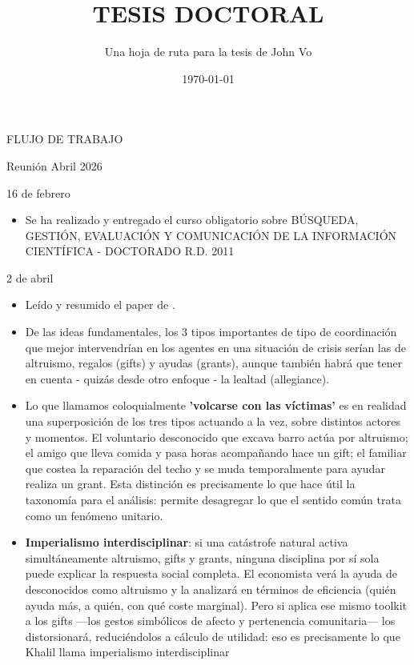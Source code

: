 \documentclass[a4paper,11pt]{article}
\title{TESIS DOCTORAL}
\author{Una hoja de ruta para la tesis de John Vo}
\date{\today}
\begin{document}
\maketitle

\newpage

\vspace*{\fill}
\begin{center}
    {\fontsize{1.5cm}{16pt}\selectfont FLUJO DE TRABAJO}
\end{center}
\vspace*{\fill}
\newpage

    \begin{seccionbox}[violetasuave]{Reunión Abril 2026}
        \begin{updateo}{16 de febrero}
            \begin{itemize}
                \item Se ha realizado y entregado el curso obligatorio sobre BÚSQUEDA, GESTIÓN, EVALUACIÓN Y COMUNICACIÓN DE LA INFORMACIÓN CIENTÍFICA - DOCTORADO R.D. 2011
            \end{itemize}
        \end{updateo} 
        \begin{updateo}{2 de abril}
            \begin{itemize}
                \item Leído y resumido el paper de \textcite{khalil_2025a}. 
                \item De las ideas fundamentales, los 3 tipos importantes de tipo de coordinación que mejor intervendrían en los agentes en una situación de crisis serían las de altruismo, regalos (gifts) y ayudas (grants), aunque también habrá que tener en cuenta - quizás desde otro enfoque - la lealtad (allegiance).
                \item Lo que llamamos coloquialmente \textbf{'volcarse con las víctimas'} es en realidad una superposición de los tres tipos actuando a la vez, sobre distintos actores y momentos. El voluntario desconocido que excava barro actúa por altruismo; el amigo que lleva comida y pasa horas acompañando hace un gift; el familiar que costea la reparación del techo y se muda temporalmente para ayudar realiza un grant. Esta distinción es precisamente lo que hace útil la taxonomía para el análisis: permite desagregar lo que el sentido común trata como un fenómeno unitario.
                \item \textbf{Imperialismo interdisciplinar}: si una catástrofe natural activa simultáneamente altruismo, gifts y grants, ninguna disciplina por sí sola puede explicar la respuesta social completa. El economista verá la ayuda de desconocidos como altruismo y la analizará en términos de eficiencia (quién ayuda más, a quién, con qué coste marginal). Pero si aplica ese mismo toolkit a los gifts —los gestos simbólicos de afecto y pertenencia comunitaria— los distorsionará, reduciéndolos a cálculo de utilidad: eso es precisamente lo que Khalil llama imperialismo interdisciplinar

\end{itemize}
\end{updateo}
\end{seccionbox}
\end{document}
